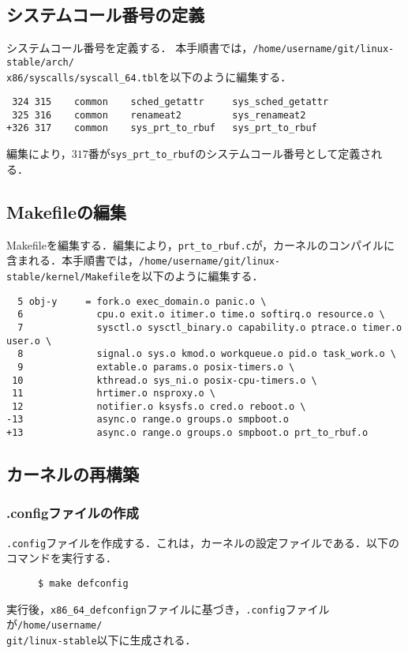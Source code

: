\documentclass[12pt]{jsarticle}
\begin{document}
\subsection{システムコール番号の定義}
システムコール番号を定義する．
本手順書では，\verb|/home/username/git/linux-stable/arch/|\\
\verb|x86/syscalls/syscall_64.tbl|を以下のように編集する．

\begin{verbatim}
 324 315    common    sched_getattr     sys_sched_getattr
 325 316    common    renameat2	        sys_renameat2
+326 317    common    sys_prt_to_rbuf   sys_prt_to_rbuf
\end{verbatim}
編集により，$317$番が\verb|sys_prt_to_rbuf|のシステムコール番号として定義される．
\subsection{Makefileの編集}
Makefileを編集する．編集により，\verb|prt_to_rbuf.c|が，カーネルのコンパイルに含まれる．本手順書では，\verb|/home/username/git/linux-stable/kernel/Makefile|を以下のように編集する．
\begin{verbatim}
  5 obj-y     = fork.o exec_domain.o panic.o \
  6             cpu.o exit.o itimer.o time.o softirq.o resource.o \
  7             sysctl.o sysctl_binary.o capability.o ptrace.o timer.o user.o \
  8             signal.o sys.o kmod.o workqueue.o pid.o task_work.o \
  9             extable.o params.o posix-timers.o \
 10             kthread.o sys_ni.o posix-cpu-timers.o \
 11             hrtimer.o nsproxy.o \
 12             notifier.o ksysfs.o cred.o reboot.o \
-13             async.o range.o groups.o smpboot.o
+13             async.o range.o groups.o smpboot.o prt_to_rbuf.o
\end{verbatim}
\subsection{カーネルの再構築}
\subsubsection{.configファイルの作成}
\verb|.config|ファイルを作成する．これは，カーネルの設定ファイルである．以下のコマンドを実行する．
\begin{description}
\item[] \verb|$ make defconfig|
\end{description}
実行後，\verb|x86_64_defconfign|ファイルに基づき，\verb|.config|ファイルが\verb|/home/username/|\\
\verb|git/linux-stable|以下に生成される．
\end{document}
